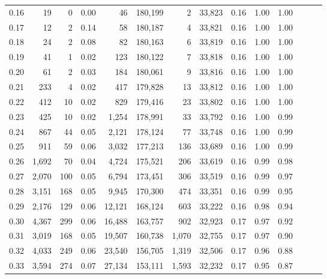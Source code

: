 \begin{tabular}{rrrrrrrrrrrrrr}
0.16 &      19 &      0 &  0.00 &       46 &  180,199 &       2 &  33,823 &  0.16 &  1.00 &      1.00 \\
0.17 &      12 &      2 &  0.14 &       58 &  180,187 &       4 &  33,821 &  0.16 &  1.00 &      1.00 \\
0.18 &      24 &      2 &  0.08 &       82 &  180,163 &       6 &  33,819 &  0.16 &  1.00 &      1.00 \\
0.19 &      41 &      1 &  0.02 &      123 &  180,122 &       7 &  33,818 &  0.16 &  1.00 &      1.00 \\
0.20 &      61 &      2 &  0.03 &      184 &  180,061 &       9 &  33,816 &  0.16 &  1.00 &      1.00 \\
0.21 &     233 &      4 &  0.02 &      417 &  179,828 &      13 &  33,812 &  0.16 &  1.00 &      1.00 \\
0.22 &     412 &     10 &  0.02 &      829 &  179,416 &      23 &  33,802 &  0.16 &  1.00 &      1.00 \\
0.23 &     425 &     10 &  0.02 &    1,254 &  178,991 &      33 &  33,792 &  0.16 &  1.00 &      0.99 \\
0.24 &     867 &     44 &  0.05 &    2,121 &  178,124 &      77 &  33,748 &  0.16 &  1.00 &      0.99 \\
0.25 &     911 &     59 &  0.06 &    3,032 &  177,213 &     136 &  33,689 &  0.16 &  1.00 &      0.99 \\
0.26 &   1,692 &     70 &  0.04 &    4,724 &  175,521 &     206 &  33,619 &  0.16 &  0.99 &      0.98 \\
0.27 &   2,070 &    100 &  0.05 &    6,794 &  173,451 &     306 &  33,519 &  0.16 &  0.99 &      0.97 \\
0.28 &   3,151 &    168 &  0.05 &    9,945 &  170,300 &     474 &  33,351 &  0.16 &  0.99 &      0.95 \\
0.29 &   2,176 &    129 &  0.06 &   12,121 &  168,124 &     603 &  33,222 &  0.16 &  0.98 &      0.94 \\
0.30 &   4,367 &    299 &  0.06 &   16,488 &  163,757 &     902 &  32,923 &  0.17 &  0.97 &      0.92 \\
0.31 &   3,019 &    168 &  0.05 &   19,507 &  160,738 &   1,070 &  32,755 &  0.17 &  0.97 &      0.90 \\
0.32 &   4,033 &    249 &  0.06 &   23,540 &  156,705 &   1,319 &  32,506 &  0.17 &  0.96 &      0.88 \\
0.33 &   3,594 &    274 &  0.07 &   27,134 &  153,111 &   1,593 &  32,232 &  0.17 &  0.95 &      0.87 \\

\end{tabular}

